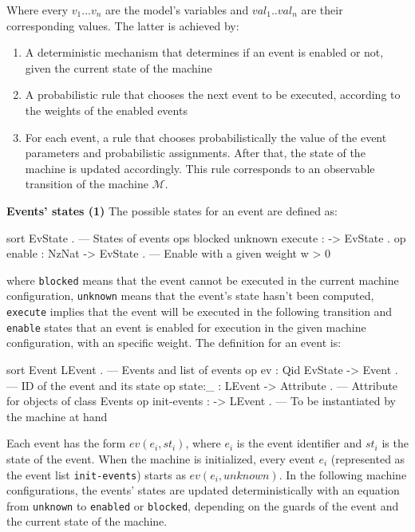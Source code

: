Where every $v_1 ... v_n$ are the model's variables and $val_1..val_n$ are their corresponding values. The latter is achieved by:

\begin{enumerate}
    \item A deterministic mechanism that determines if an event is enabled or not, given the current state of the machine
    \item A probabilistic rule that chooses the next event to be executed, according to the weights of the enabled events
    \item For each event, a rule that chooses probabilistically the value of the event parameters and probabilistic assignments. After that, the state of the machine is updated accordingly. This rule corresponds to an observable transition of the machine $\mathscr{M}$.
\end{enumerate}
\textbf{Events' states (1)} The possible states for an event are defined as:
\\
\begin{maude}
 sort EvState . --- States of events
 ops blocked unknown execute : -> EvState . 
 op enable : NzNat -> EvState . --- Enable with a given weight w > 0
\end{maude}
where \texttt{blocked} means that the event cannot be executed in the current machine configuration, \texttt{unknown} means that the event's state hasn't been computed, \texttt{execute} implies that the event will be executed in the following transition and \texttt{enable} states that an event is enabled for execution in the given machine configuration, with an specific weight. The definition for an event is:
\\
\begin{maude}
   sort Event LEvent . --- Events and list of events
   op ev : Qid EvState -> Event . --- ID of the event and its state
   op state:_ : LEvent -> Attribute . --- Attribute for objects of class Events   
   op init-events : -> LEvent . --- To be instantiated by the machine at hand
\end{maude}
Each event has the form $ev(e_i, st_i)$, where $e_i$ is the event identifier and $st_i$ is the state of the event. When the machine is initialized, every event $e_i$ (represented as the event list \texttt{init-events}) starts as $ev(e_i, unknown)$. In the following machine configurations, the events' states are updated deterministically with an equation from \texttt{unknown} to \texttt{enabled} or \texttt{blocked}, depending on the guards of the event and the current state of the machine.

